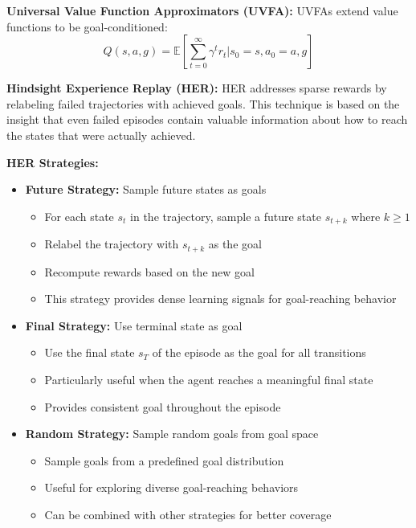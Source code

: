 \documentclass[12pt]{article}
\begin{document}
{{\textbf{Universal Value Function Approximators (UVFA):}
UVFAs extend value functions to be goal-conditioned:
\[
Q(s,a,g) = \mathbb{E}[\sum_{t=0}^{\infty} \gamma^t r_t | s_0 = s, a_0 = a, g]
\]

\textbf{Hindsight Experience Replay (HER):}
HER addresses sparse rewards by relabeling failed trajectories with achieved goals. This technique is based on the insight that even failed episodes contain valuable information about how to reach the states that were actually achieved.

\textbf{HER Strategies:}
\begin{itemize}
    \item \textbf{Future Strategy:} Sample future states as goals
    \begin{itemize}
        \item For each state $s_t$ in the trajectory, sample a future state $s_{t+k}$ where $k \geq 1$
        \item Relabel the trajectory with $s_{t+k}$ as the goal
        \item Recompute rewards based on the new goal
        \item This strategy provides dense learning signals for goal-reaching behavior
    \end{itemize}
    
    \item \textbf{Final Strategy:} Use terminal state as goal
    \begin{itemize}
        \item Use the final state $s_T$ of the episode as the goal for all transitions
        \item Particularly useful when the agent reaches a meaningful final state
        \item Provides consistent goal throughout the episode
    \end{itemize}
    
    \item \textbf{Random Strategy:} Sample random goals from goal space
    \begin{itemize}
        \item Sample goals from a predefined goal distribution
        \item Useful for exploring diverse goal-reaching behaviors
        \item Can be combined with other strategies for better coverage
    \end{itemize}
\end{itemize}

}}
\end{document}
